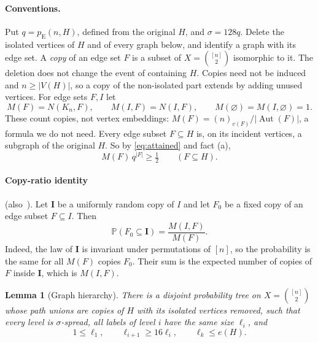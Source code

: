 \documentclass[11pt]{article}
\newtheorem{lemma}[theorem]{Lemma}
\numberwithin{equation}{section}
\newcommand{\PP}{\mathbb P}
\newcommand{\pE}{p_{\mathrm E}}
\begin{document}
\paragraph{Conventions.} Put $q=\pE(n,H)$, defined from the original $H$, and
$\sigma=128q$. Delete the isolated vertices of $H$ and of every graph below, and
identify a graph with its edge set. A \emph{copy} of an edge set $F$ is a subset
of $X=\binom{[n]}2$ isomorphic to it. The deletion does not change the event of
containing $H$. Copies need not be induced and $n\ge|V(H)|$, so a copy of the
non-isolated part extends by adding unused vertices. For edge sets $F,I$ let
\[
 M(F)=N(K_n,F),\qquad M(I,F)=N(I,F),\qquad M(\varnothing)=M(I,\varnothing)=1 .
\]
These count copies, not vertex embeddings:
$M(F)=(n)_{v(F)}/|\operatorname{Aut}(F)|$, a formula we do not need. Every edge
subset $F\subseteq H$ is, on its incident vertices, a subgraph of the original
$H$. So by \eqref{eq:attained} and fact (a),
\begin{equation}\label{eq:first-moment}
 M(F)\,q^{|F|}\ge\tfrac12\qquad(F\subseteq H).
\end{equation}

\paragraph{Copy-ratio identity} (also~\cite[Equation~(5)]{MNSZ22}). Let
$\boldsymbol I$ be a uniformly random copy of $I$ and let $F_0$ be a fixed copy
of an edge subset $F\subseteq I$. Then
\begin{equation}\label{eq:copy-ratio}
 \PP(F_0\subseteq\boldsymbol I)=\frac{M(I,F)}{M(F)} .
\end{equation}
Indeed, the law of $\boldsymbol I$ is invariant under permutations of $[n]$, so
the probability is the same for all $M(F)$ copies $F_0$. Their sum is the
expected number of copies of $F$ inside $\boldsymbol I$, which is $M(I,F)$.

\begin{lemma}[Graph hierarchy]\label{lem:hierarchy}
There is a disjoint probability tree on
$X=\binom{[n]}2$ whose path unions are copies of $H$ with its isolated
vertices removed, such that every level is $\sigma$-spread, all labels of
level $i$ have the same size $\ell_i$, and
\[
 1\le\ell_1,\qquad \ell_{i+1}\ge16\ell_i,\qquad \ell_k\le e(H).
\]
\end{lemma}
\end{document}
